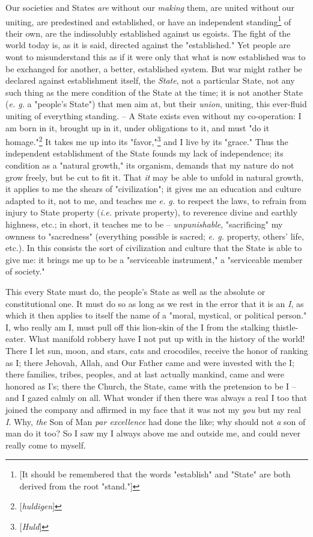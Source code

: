 \documentclass[a4paper]{book}
\begin{document}
Our societies and States \textit{are} without our \textit{making} them, are 
united without our uniting, are predestined and established, or have an 
independent standing\footnote{[It should be remembered that the words 
"{}establish"{} and "{}State"{} are both derived from the root "{}stand."{}]} 
of their own, are the indissolubly established against us egoists. The fight 
of the world today is, as it is said, directed against the "{}established."{} 
Yet people are wont to misunderstand this as if it were only that what is now 
established was to be exchanged for another, a better, established system. But 
war might rather be declared against establishment itself, the \textit{State}, 
not a particular State, not any such thing as the mere condition of the State 
at the time; it is not another State (\textit{e. g.} a "{}people's State"{}) 
that men aim at, but their \textit{union}, uniting, this ever-fluid uniting of 
everything standing. -- A State exists even without my co-operation: I am born 
in it, brought up in it, under obligations to it, and must "{}do it 
homage."{}\footnote{[\textit{huldigen}]} It takes me up into its 
"{}favor,"{}\footnote{[\textit{Huld}]} and I live by its "{}grace."{} Thus the 
independent establishment of the State founds my lack of independence; its 
condition as a "{}natural growth,"{} its organism, demands that my nature do 
not grow freely, but be cut to fit it. That \textit{it} may be able to unfold 
in natural growth, it applies to me the shears of "{}civilization"{}; it gives 
me an education and culture adapted to it, not to me, and teaches me 
\textit{e. g.} to respect the laws, to refrain from injury to State property 
(\textit{i.e.} private property), to reverence divine and earthly highness, 
etc.; in short, it teaches me to be -- \textit{unpunishable}, 
"{}sacrificing"{} my ownness to "{}sacredness"{} (everything possible is 
sacred; \textit{e. g.} property, others' life, etc.). In this consists the 
sort of civilization and culture that the State is able to give me: it brings 
me up to be a "{}serviceable instrument,"{} a "{}serviceable member of 
society."{}

This every State must do, the people's State as well as the absolute or 
constitutional one. It must do so as long as we rest in the error that it is 
an \textit{I}, as which it then applies to itself the name of a "{}moral, 
mystical, or political person."{} I, who really am I, must pull off this 
lion-skin of the I from the stalking thistle-eater. What manifold robbery have 
I not put up with in the history of the world! There I let sun, moon, and 
stars, cats and crocodiles, receive the honor of ranking as I; there Jehovah, 
Allah, and Our Father came and were invested with the I; there families, 
tribes, peoples, and at last actually mankind, came and were honored as I's; 
there the Church, the State, came with the pretension to be I -- and I gazed 
calmly on all. What wonder if then there was always a real I too that joined 
the company and affirmed in my face that it was not my \textit{you} but my 
real \textit{I}. Why, \textit{the} Son of Man \textit{par excellence} had done 
the like; why should not \textit{a} son of man do it too? So I saw my I always 
above me and outside me, and could never really come to myself.
\end{document}
